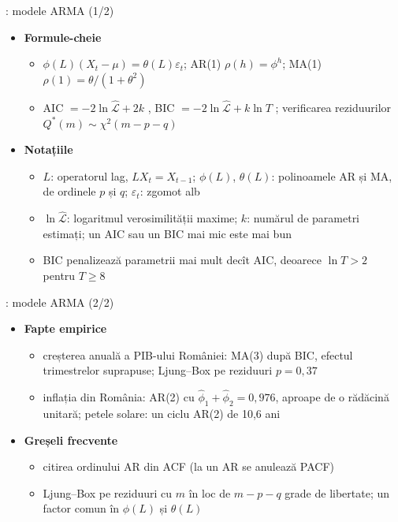 \begin{frame}{: modele ARMA (1/2)}
\itemsize{\footnotesize}
\begin{itemize}
    \item \textbf{Formule-cheie}
    \begin{itemize}
        \item $\phi(L)(X_t - \mu) = \theta(L)\varepsilon_t$; AR(1) $\rho(h) = \phi^h$; MA(1) $\rho(1) = \theta/(1 + \theta^2)$
        \item AIC $= -2\ln\hat{\mathcal{L}} + 2k$ , BIC $= -2\ln\hat{\mathcal{L}} + k\ln T$ ; verificarea reziduurilor $Q^*(m) \sim \chi^2(m - p - q)$
    \end{itemize}
    \item \textbf{Notațiile}
    \begin{itemize}
        \item $L$: operatorul lag, $LX_t = X_{t-1}$; $\phi(L)$, $\theta(L)$: polinoamele AR și MA, de ordinele $p$ și $q$; $\varepsilon_t$: zgomot alb
        \item $\ln\hat{\mathcal{L}}$: logaritmul verosimilității maxime; $k$: numărul de parametri estimați; un AIC sau un BIC mai mic este mai bun
        \item BIC penalizează parametrii mai mult decît AIC, deoarece $\ln T > 2$ pentru $T \ge 8$
    \end{itemize}
\end{itemize}
\end{frame}

\begin{frame}{: modele ARMA (2/2)}
\itemsize{\footnotesize}
\begin{itemize}
    \item \textbf{Fapte empirice}
    \begin{itemize}
        \item creșterea anuală a PIB-ului României: MA(3) după BIC, efectul trimestrelor suprapuse; Ljung--Box pe reziduuri $p = 0{,}37$
        \item inflația din România: AR(2) cu $\hat\phi_1 + \hat\phi_2 = 0{,}976$, aproape de o rădăcină unitară; petele solare: un ciclu AR(2) de 10{,}6 ani
    \end{itemize}
    \item \textbf{Greșeli frecvente}
    \begin{itemize}
        \item citirea ordinului AR din ACF (la un AR se anulează PACF)
        \item Ljung--Box pe reziduuri cu $m$ în loc de $m - p - q$ grade de libertate; un factor comun în $\phi(L)$ și $\theta(L)$
    \end{itemize}
\end{itemize}
\end{frame}

